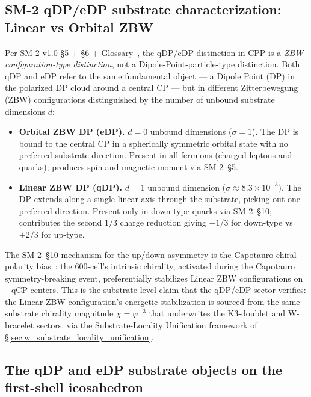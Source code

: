 \documentclass[11pt,letterpaper]{article}
\newcommand{\phig}{\varphi}
\begin{document}
\subsection{SM-2 qDP/eDP substrate characterization: Linear vs Orbital ZBW}\label{sec:sm2_zbw_characterization}

Per SM-2 v1.0 \S5 + \S6 + Glossary~\cite{abshier_sm2}, the qDP/eDP distinction in CPP is a \emph{ZBW-configuration-type distinction}, not a Dipole-Point-particle-type distinction. Both qDP and eDP refer to the same fundamental object --- a Dipole Point (DP) in the polarized DP cloud around a central CP --- but in different Zitterbewegung (ZBW) configurations distinguished by the number of unbound substrate dimensions $d$:

\begin{itemize}\setlength\itemsep{0.2em}
    \item \textbf{Orbital ZBW DP (eDP).} $d = 0$ unbound dimensions ($\sigma = 1$). The DP is bound to the central CP in a spherically symmetric orbital state with no preferred substrate direction. Present in all fermions (charged leptons and quarks); produces spin and magnetic moment via SM-2~\S5.
    \item \textbf{Linear ZBW DP (qDP).} $d = 1$ unbound dimension ($\sigma \approx 8.3 \times 10^{-3}$). The DP extends along a single linear axis through the substrate, picking out one preferred direction. Present only in down-type quarks via SM-2~\S10; contributes the second $1/3$ charge reduction giving $-1/3$ for down-type vs $+2/3$ for up-type.
\end{itemize}

The SM-2~\S10 mechanism for the up/down asymmetry is the Capotauro chiral-polarity bias~\cite{abshier_sm2}: the 600-cell's intrinsic chirality, activated during the Capotauro symmetry-breaking event, preferentially stabilizes Linear ZBW configurations on $-$qCP centers. This is the substrate-level claim that the qDP/eDP sector verifies: the Linear ZBW configuration's energetic stabilization is sourced from the same substrate chirality magnitude $\chi = \phig^{-3}$ that underwrites the K3-doublet and W-bracelet sectors, via the Substrate-Locality Unification framework of \S\ref{sec:w_substrate_locality_unification}.

\subsection{The qDP and eDP substrate objects on the first-shell icosahedron}\label{sec:qdp_edp_substrate_objects}
\end{document}
